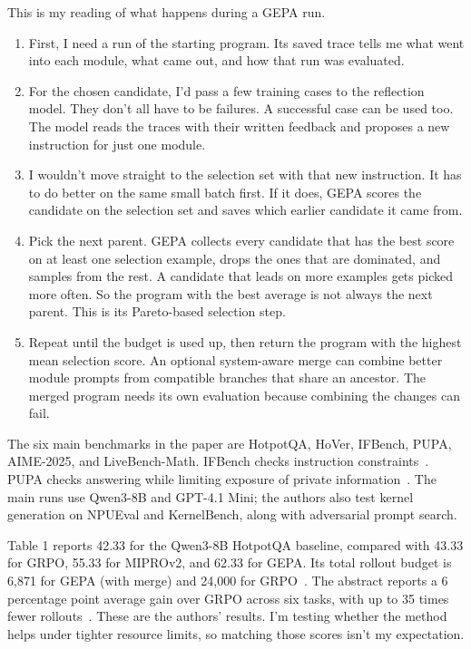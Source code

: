 \documentclass[11pt,a4paper]{article}
\begin{document}
\newpage
This is my reading of what happens during a GEPA run.
\begin{enumerate}
\setlength{\itemsep}{0pt}
\setlength{\parskip}{0pt}
\item First, I need a run of the starting program. Its saved trace tells me what
went into each module, what came out, and how that run was evaluated.
\item For the chosen candidate, I'd pass a few training cases to the reflection
model. They don't all have to be failures. A successful case can be used too.
The model reads the traces with their written feedback and proposes a new
instruction for just one module.
\item I wouldn't move straight to the selection set with that new instruction.
It has to do better on the same small batch first. If it does, GEPA scores the
candidate on the selection set and saves which earlier candidate it came from.
\item Pick the next parent. GEPA collects every candidate that has the best
score on at least one selection example, drops the ones that are dominated, and
samples from the rest. A candidate that leads on more examples gets picked more
often. So the program with the best average is not always the next parent. This
is its Pareto-based selection step.
\item Repeat until the budget is used up, then return the program with the
highest mean selection score. An optional system-aware merge can combine better
module prompts from compatible branches that share an ancestor. The merged
program needs its own evaluation because combining the changes can fail.
\end{enumerate}

The six main benchmarks in the paper are HotpotQA, HoVer, IFBench, PUPA, AIME-2025, and LiveBench-Math. IFBench checks instruction constraints~\cite{ifbench}. PUPA checks answering while limiting exposure of private information~\cite{pupa}. The main runs use Qwen3-8B and GPT-4.1 Mini; the authors also test kernel generation on NPUEval and KernelBench, along with adversarial prompt search.

Table 1 reports 42.33 for the Qwen3-8B HotpotQA baseline, compared with 43.33 for GRPO, 55.33 for MIPROv2, and 62.33 for GEPA. Its total rollout budget is 6,871 for GEPA (with merge) and 24,000 for GRPO~\cite{gepa}. The abstract reports a 6 percentage point average gain over GRPO across six tasks, with up to 35 times fewer rollouts~\cite{gepa}. These are the authors' results. I'm testing whether the method helps under tighter resource limits, so matching those scores isn't my expectation.
\end{document}
